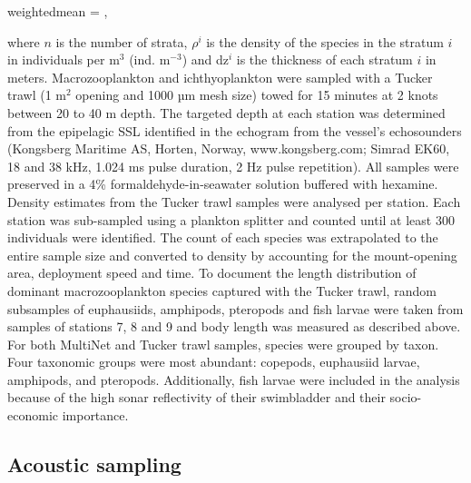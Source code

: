 \begin{muneqn}{weightedmean}
\rho = ,
\end{muneqn}

where $n$ is the number of strata, $\rho^i$ is the density of the species in the stratum $i$ in individuals per m$^3$ (ind. m$^{-3}$) and dz$^i$ is the thickness of each stratum $i$ in meters.
Macrozooplankton and ichthyoplankton were sampled with a Tucker trawl (1 m$^2$ opening and 1000 µm mesh size) towed for 15 minutes at 2 knots between 20 to 40 m depth. The targeted depth at each station was determined from the epipelagic SSL identified in the echogram from the vessel's echosounders (Kongsberg Maritime AS, Horten, Norway, www.kongsberg.com; Simrad EK60, 18 and 38 kHz, 1.024 ms pulse duration, 2 Hz pulse repetition). All samples were preserved in a 4\% formaldehyde-in-seawater solution buffered with hexamine. Density estimates from the Tucker trawl samples were analysed per station. Each station was sub-sampled using a plankton splitter and counted until at least 300 individuals were identified. The count of each species was extrapolated to the entire sample size and converted to density by accounting for the mount-opening area, deployment speed and time. To document the length distribution of dominant macrozooplankton species captured with the Tucker trawl, random subsamples of euphausiids, amphipods, pteropods and fish larvae were taken from samples of stations 7, 8 and 9 and body length was measured as described above. \\
For both MultiNet and Tucker trawl samples, species were grouped by taxon. Four taxonomic groups were most abundant: copepods, euphausiid larvae, amphipods, and pteropods. Additionally, fish larvae were included in the analysis because of the high sonar reflectivity of their swimbladder and their socio-economic importance. 

\subsection{Acoustic sampling}
